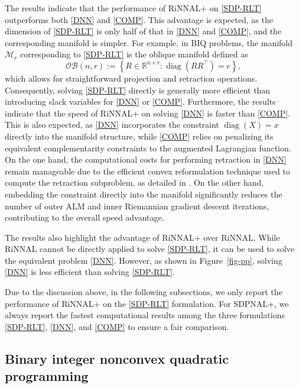\documentclass[11pt]{article}
\theoremstyle{plain}
\def\M{\mathcal{M}}
\DeclareMathOperator{\diag}{diag}
\begin{document}
The results indicate that the performance of RiNNAL+ on \eqref{SDP-RLT} outperforms both \eqref{DNN} and \eqref{COMP}. This advantage is expected, as the dimension of \eqref{SDP-RLT} is only half of that in \eqref{DNN} and \eqref{COMP}, and the corresponding manifold is simpler. For example, in BIQ problems, the manifold $\M_r$ corresponding to \eqref{SDP-RLT} is the oblique manifold defined as
\[
\mathcal{OB}(n, r) := \left\{ R \in \mathbb{R}^{n \times r} : \diag(RR^\top) = e \right\},
\]
which allows for straightforward projection and retraction operations. Consequently, solving \eqref{SDP-RLT} directly is generally more efficient than introducing slack variables for \eqref{DNN} or \eqref{COMP}. 
Furthermore, the results indicate that the speed of RiNNAL+ on solving \eqref{DNN} is faster than \eqref{COMP}. This is also expected, as \eqref{DNN} incorporates the constraint $\diag(X) = x$ directly into the manifold structure, while \eqref{COMP} relies on penalizing its equivalent complementarity constraints to the augmented Lagrangian function. On the one hand, the computational costs for performing retraction in \eqref{DNN} remain manageable due to the efficient convex reformulation technique used to compute the retraction subproblem, as detailed in \cite{RiNNAL}. On the other hand, embedding the constraint directly into the manifold significantly reduces the number of outer ALM and inner Riemannian gradient descent iterations, contributing to the overall speed advantage.

The results also highlight the advantage of RiNNAL+ over RiNNAL. While RiNNAL cannot be directly applied to solve \eqref{SDP-RLT}, it can be used to solve the equivalent problem \eqref{DNN}. However, as shown in Figure~\ref{fig-pp}, solving \eqref{DNN} is less efficient than solving \eqref{SDP-RLT}.

Due to the discussion above, in the following subsections, we only report the performance of RiNNAL+ on the \eqref{SDP-RLT} formulation. For SDPNAL+, we always report the fastest computational results among the three formulations \eqref{SDP-RLT}, \eqref{DNN}, and \eqref{COMP} to ensure a fair comparison.




\subsection{Binary integer nonconvex quadratic programming}\label{subsec-BIQ}
\end{document}
